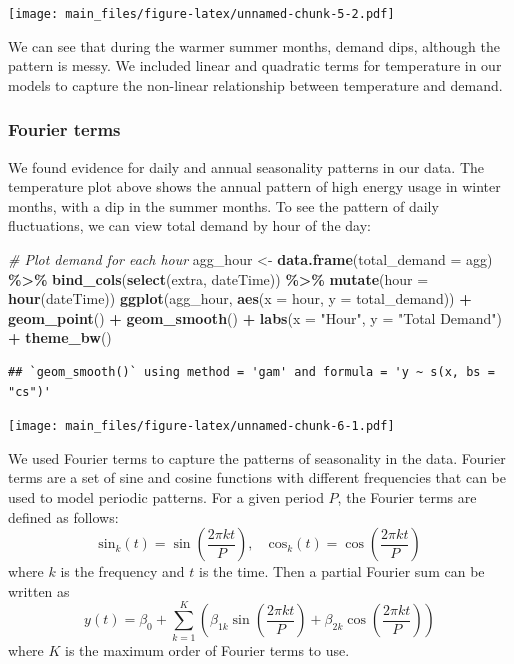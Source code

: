 \documentclass[
]{article}
\newenvironment{Shaded}{\begin{snugshade}}{\end{snugshade}}
\newcommand{\AttributeTok}[1]{\textcolor[rgb]{0.13,0.29,0.53}{#1}}
\newcommand{\CommentTok}[1]{\textcolor[rgb]{0.56,0.35,0.01}{\textit{#1}}}
\newcommand{\FunctionTok}[1]{\textcolor[rgb]{0.13,0.29,0.53}{\textbf{#1}}}
\newcommand{\NormalTok}[1]{#1}
\newcommand{\OtherTok}[1]{\textcolor[rgb]{0.56,0.35,0.01}{#1}}
\newcommand{\SpecialCharTok}[1]{\textcolor[rgb]{0.81,0.36,0.00}{\textbf{#1}}}
\newcommand{\StringTok}[1]{\textcolor[rgb]{0.31,0.60,0.02}{#1}}
\begin{document}
\texttt{[image: main\_files/figure-latex/unnamed-chunk-5-2.pdf]}

We can see that during the warmer summer months, demand dips, although
the pattern is messy. We included linear and quadratic terms for
temperature in our models to capture the non-linear relationship between
temperature and demand.

\hypertarget{fourier-terms}{%
\subsubsection{Fourier terms}\label{fourier-terms}}

We found evidence for daily and annual seasonality patterns in our data.
The temperature plot above shows the annual pattern of high energy usage
in winter months, with a dip in the summer months. To see the pattern of
daily fluctuations, we can view total demand by hour of the day:

\begin{Shaded}
\begin{Highlighting}[]
\CommentTok{\# Plot demand for each hour }
\NormalTok{agg\_hour }\OtherTok{\textless{}{-}} \FunctionTok{data.frame}\NormalTok{(}\AttributeTok{total\_demand =}\NormalTok{ agg) }\SpecialCharTok{\%\textgreater{}\%} 
  \FunctionTok{bind\_cols}\NormalTok{(}\FunctionTok{select}\NormalTok{(extra, dateTime)) }\SpecialCharTok{\%\textgreater{}\%} 
  \FunctionTok{mutate}\NormalTok{(}\AttributeTok{hour =} \FunctionTok{hour}\NormalTok{(dateTime))}
\FunctionTok{ggplot}\NormalTok{(agg\_hour, }\FunctionTok{aes}\NormalTok{(}\AttributeTok{x =}\NormalTok{ hour, }\AttributeTok{y =}\NormalTok{ total\_demand)) }\SpecialCharTok{+}
  \FunctionTok{geom\_point}\NormalTok{() }\SpecialCharTok{+}
  \FunctionTok{geom\_smooth}\NormalTok{() }\SpecialCharTok{+}
  \FunctionTok{labs}\NormalTok{(}\AttributeTok{x =} \StringTok{"Hour"}\NormalTok{, }\AttributeTok{y =} \StringTok{"Total Demand"}\NormalTok{) }\SpecialCharTok{+}
  \FunctionTok{theme\_bw}\NormalTok{()}
\end{Highlighting}
\end{Shaded}

\begin{verbatim}
## `geom_smooth()` using method = 'gam' and formula = 'y ~ s(x, bs = "cs")'
\end{verbatim}

\texttt{[image: main\_files/figure-latex/unnamed-chunk-6-1.pdf]}

We used Fourier terms to capture the patterns of seasonality in the
data. Fourier terms are a set of sine and cosine functions with
different frequencies that can be used to model periodic patterns. For a
given period \(P\), the Fourier terms are defined as follows:
\[\text{sin}_k(t) = \sin\left(\frac{2\pi kt}{P}\right), \quad \text{cos}_k(t) = \cos\left(\frac{2\pi kt}{P}\right)\]
where \(k\) is the frequency and \(t\) is the time. Then a partial
Fourier sum can be written as
\[ y(t) = \beta_0 + \sum_{k=1}^{K} \left( \beta_{1k} \sin\left(\frac{2\pi kt}{P}\right) + \beta_{2k} \cos\left(\frac{2\pi kt}{P}\right) \right) \]
where \(K\) is the maximum order of Fourier terms to use.
\end{document}
